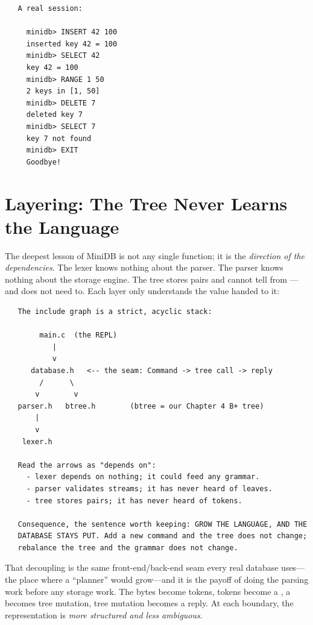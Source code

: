 \begin{verbatim}
   A real session:

     minidb> INSERT 42 100
     inserted key 42 = 100
     minidb> SELECT 42
     key 42 = 100
     minidb> RANGE 1 50
     2 keys in [1, 50]
     minidb> DELETE 7
     deleted key 7
     minidb> SELECT 7
     key 7 not found
     minidb> EXIT
     Goodbye!
\end{verbatim}

\section{Layering: The Tree Never Learns the Language}

The deepest lesson of MiniDB is not any single function; it is the
\emph{direction of the dependencies}. The lexer knows nothing about
the parser. The parser knows nothing about the storage engine. The
tree stores  pairs and cannot tell  from
---and does not need to. Each layer only understands the
value handed to it:

\begin{verbatim}
   The include graph is a strict, acyclic stack:

        main.c  (the REPL)
           |
           v
      database.h   <-- the seam: Command -> tree call -> reply
        /      \
       v        v
   parser.h   btree.h        (btree = our Chapter 4 B+ tree)
       |
       v
    lexer.h

   Read the arrows as "depends on":
     - lexer depends on nothing; it could feed any grammar.
     - parser validates streams; it has never heard of leaves.
     - tree stores pairs; it has never heard of tokens.

   Consequence, the sentence worth keeping: GROW THE LANGUAGE, AND THE
   DATABASE STAYS PUT. Add a new command and the tree does not change;
   rebalance the tree and the grammar does not change.
\end{verbatim}

That decoupling is the same front-end/back-end seam every real database
uses---the place where a ``planner'' would grow---and it is the payoff
of doing the parsing work before any storage work. The bytes become
tokens, tokens become a , a \code{Command} becomes tree
mutation, tree mutation becomes a reply. At each boundary, the
representation is \emph{more structured and less ambiguous}.

